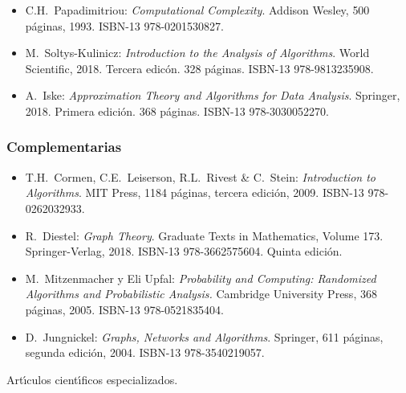\begin{itemize}[itemsep=-1pt]
  
  \item C.H.\ {\sc Papadimitriou}: {\em Computational                                                                                                               
     Complexity}. Addison Wesley, 500 p\'{a}ginas, 1993. ISBN-13
   978-0201530827.

\item M.\ Soltys-Kulinicz: {\em Introduction to the Analysis of
  Algorithms}. World Scientific, 2018. Tercera edic\'{o}n. 328
  p\'{a}ginas. ISBN-13 978-9813235908.

\item A.\ Iske: {\em Approximation Theory and Algorithms for Data
  Analysis}. Springer, 2018. Primera edici\'{o}n. 368
  p\'{a}ginas. ISBN-13 978-3030052270.

   
\end{itemize}

\subsubsection{Complementarias}

\begin{itemize}[itemsep=-1pt]
  
\item T.H.\ {\sc Cormen}, C.E.\ {\sc Leiserson}, R.L.\ Rivest \&
  C.\ {\sc Stein}: {\em Introduction to Algorithms}. MIT Press,
  1184 p\'{a}ginas, tercera edici\'{o}n, 2009. ISBN-13
  978-0262032933.
  
\item R.\ {\sc Diestel}: {\em Graph Theory}. Graduate Texts in
  Mathematics, Volume 173. Springer-Verlag, 2018.  ISBN-13
  978-3662575604. Quinta edici\'{o}n.
  
\item M.\ {\sc Mitzenmacher} y Eli {\sc Upfal}: {\em
    Probability and Computing: Randomized Algorithms and
    Probabilistic Analysis.}  Cambridge University Press, 368
  p\'{a}ginas, 2005. ISBN-13 978-0521835404.
    
\item D.\ {\sc Jungnickel}: {\em Graphs, Networks and
    Algorithms}. Springer, 611 p\'{a}ginas, segunda edici\'{o}n,
  2004. ISBN-13 978-3540219057.
        
\end{itemize}
 
Art\'{\i}culos cient\'{\i}ficos especializados.

\label{final} %


